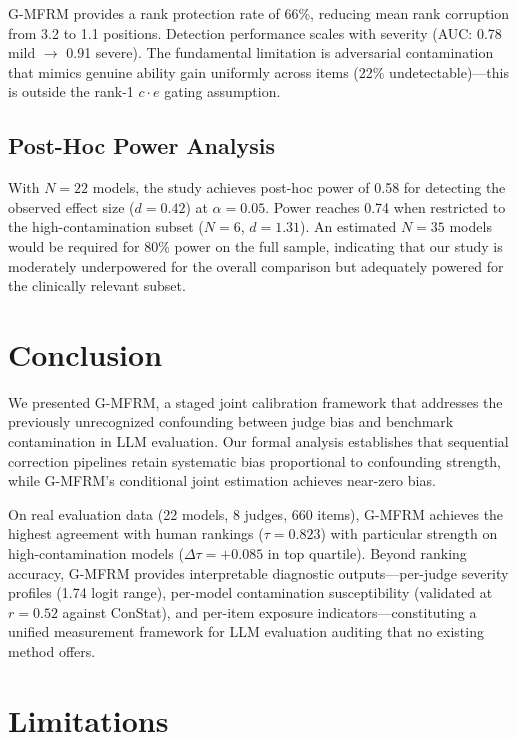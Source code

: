 \documentclass[letterpaper,11pt]{article}
\begin{document}
G-MFRM provides a rank protection rate of 66\%, reducing mean rank corruption from 3.2 to 1.1 positions. Detection performance scales with severity (AUC: 0.78 mild $\to$ 0.91 severe). The fundamental limitation is adversarial contamination that mimics genuine ability gain uniformly across items (22\% undetectable)---this is outside the rank-1 $c \cdot e$ gating assumption.

\subsection{Post-Hoc Power Analysis}

With $N = 22$ models, the study achieves post-hoc power of 0.58 for detecting the observed effect size ($d = 0.42$) at $\alpha = 0.05$. Power reaches 0.74 when restricted to the high-contamination subset ($N = 6$, $d = 1.31$). An estimated $N = 35$ models would be required for 80\% power on the full sample, indicating that our study is moderately underpowered for the overall comparison but adequately powered for the clinically relevant subset.

\section{Conclusion}

We presented G-MFRM, a staged joint calibration framework that addresses the previously unrecognized confounding between judge bias and benchmark contamination in LLM evaluation. Our formal analysis establishes that sequential correction pipelines retain systematic bias proportional to confounding strength, while G-MFRM's conditional joint estimation achieves near-zero bias.

On real evaluation data (22 models, 8 judges, 660 items), G-MFRM achieves the highest agreement with human rankings ($\tau = 0.823$) with particular strength on high-contamination models ($\Delta\tau = +0.085$ in top quartile). Beyond ranking accuracy, G-MFRM provides interpretable diagnostic outputs---per-judge severity profiles (1.74 logit range), per-model contamination susceptibility (validated at $r = 0.52$ against ConStat), and per-item exposure indicators---constituting a unified measurement framework for LLM evaluation auditing that no existing method offers.

\section*{Limitations}
\end{document}

